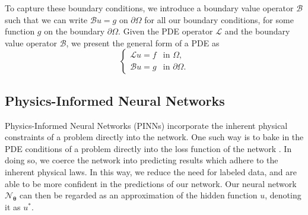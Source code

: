 To capture these boundary conditions, we introduce a boundary value operator $\mathcal B$ such that we can write $\mathcal B u = g$ on $\partial \Omega$ for all our boundary conditions, for some function $g$ on the boundary $\partial\Omega$.
Given the PDE operator $\mathcal L$ and the boundary value operator $\mathcal B$, we present the general form of a PDE as
\begin{equation}
\begin{cases}
    \mathcal{L}u = f &\text{in } \Omega,\\
    \mathcal{B}u = g &\text{in } \partial\Omega.
\end{cases}
\label{eq:PDE}
\end{equation}

\subsection{Physics-Informed Neural Networks}
Physics-Informed Neural Networks (PINNs) incorporate the inherent physical constraints of a problem directly into the network.
One such way is to bake in the PDE conditions of a problem directly into the loss function of the network \cite{RAISSI2019686}.
In doing so, we coerce the network into predicting results which adhere to the inherent physical laws.
In this way, we reduce the need for labeled data, and are able to be more confident in the predictions of our network.
Our neural network $\mathcal{N}_{\boldsymbol{\theta}}$ can then be regarded as an approximation of the hidden function $u$, denoting it as $u^*$.

